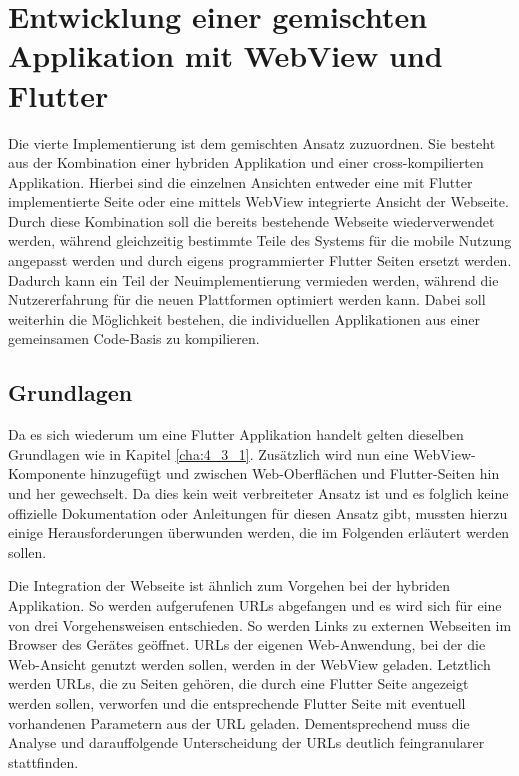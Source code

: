 \section{Entwicklung einer gemischten Applikation mit WebView und Flutter}
Die vierte Implementierung ist dem gemischten Ansatz zuzuordnen. Sie besteht aus der Kombination einer hybriden Applikation und einer cross-kompilierten Applikation.
Hierbei sind die einzelnen Ansichten entweder eine mit Flutter implementierte Seite oder eine mittels WebView integrierte Ansicht der Webseite.
Durch diese Kombination soll die bereits bestehende Webseite wiederverwendet werden, während gleichzeitig bestimmte Teile des Systems für die mobile Nutzung angepasst werden und durch eigens programmierter Flutter Seiten ersetzt werden.
Dadurch kann ein Teil der Neuimplementierung vermieden werden, während die Nutzererfahrung für die neuen Plattformen optimiert werden kann.
Dabei soll weiterhin die Möglichkeit bestehen, die individuellen Applikationen aus einer gemeinsamen Code-Basis zu kompilieren.

\subsection{Grundlagen}
Da es sich wiederum um eine Flutter Applikation handelt gelten dieselben Grundlagen wie in Kapitel \ref{cha:4_3_1}.
Zusätzlich wird nun eine WebView-Komponente hinzugefügt und zwischen Web-Oberflächen und Flutter-Seiten hin und her gewechselt.
Da dies kein weit verbreiteter Ansatz ist und es folglich keine offizielle Dokumentation oder Anleitungen für diesen Ansatz gibt, mussten hierzu einige Herausforderungen überwunden werden, die im Folgenden erläutert werden sollen.

Die Integration der Webseite ist ähnlich zum Vorgehen bei der hybriden Applikation. So werden aufgerufenen URLs abgefangen und es wird sich für eine von drei Vorgehensweisen entschieden. So werden Links zu externen Webseiten im Browser des Gerätes geöffnet. URLs der eigenen Web-Anwendung, bei der die Web-Ansicht genutzt werden sollen, werden in der WebView geladen. Letztlich werden URLs, die zu Seiten gehören, die durch eine Flutter Seite angezeigt werden sollen, verworfen und die entsprechende Flutter Seite mit eventuell vorhandenen Parametern aus der URL geladen. 
Dementsprechend muss die Analyse und darauffolgende Unterscheidung der URLs deutlich feingranularer stattfinden.

